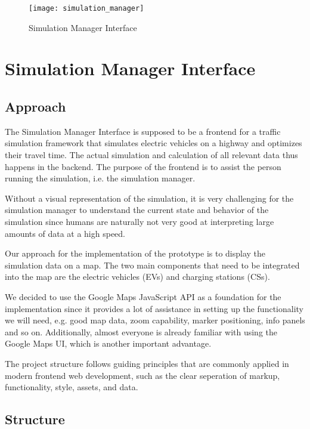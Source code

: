 \begin{figure*}[ht]
\texttt{[image: simulation\_manager]}
\caption{Simulation Manager Interface}
\end{figure*}

\newpage


\section{Simulation Manager Interface}

\subsection{Approach}

The Simulation Manager Interface is supposed to be a frontend for a traffic simulation framework that simulates electric vehicles on a highway and optimizes their travel time. The actual simulation and calculation of all relevant data thus happens in the backend. The purpose of the frontend is to assist the person running the simulation, i.e. the simulation manager.

Without a visual representation of the simulation, it is very challenging for the simulation manager to understand the current state and behavior of the simulation since humans are naturally not very good at interpreting large amounts of data at a high speed.

Our approach for the implementation of the prototype is to display the simulation data on a map. The two main components that need to be integrated into the map are the electric vehicles (EVs) and charging stations (CSs).

We decided to use the Google Maps JavaScript API as a foundation for the implementation since it provides a lot of assistance in setting up the functionality we will need, e.g. good map data, zoom capability, marker positioning, info panels and so on. Additionally, almost everyone is already familiar with using the Google Maps UI, which is another important advantage.

The project structure follows guiding principles that are commonly applied in modern frontend web development, such as the clear seperation of markup, functionality, style, assets, and data.


\subsection{Structure}

